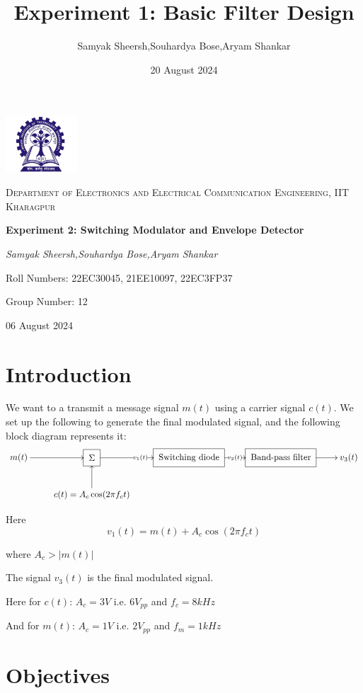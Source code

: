 \documentclass{article}
\title{Experiment 1: Basic Filter Design}
\author{Samyak Sheersh,Souhardya Bose,Aryam Shankar}
\date{20 August 2024}
\begin{document}
\begin{titlepage}
    \centering
    \includegraphics[width=0.2\textwidth]{KGP_logo.png}\par\vspace{1cm}
    {\scshape\LARGE Department of Electronics and Electrical Communication Engineering, IIT Kharagpur\par}
    \vspace{1cm}
    {\huge\bfseries Experiment 2: Switching Modulator and Envelope Detector\par}
    \vspace{1.5cm}
    {\Large\itshape Samyak Sheersh,Souhardya Bose,Aryam Shankar\par}
    \vfill
    {\large Roll Numbers: 22EC30045, 21EE10097, 22EC3FP37\par}
    {\large Group Number: 12\par}
    \vfill
    {\large 06 August 2024\par}
\end{titlepage}


\section{Introduction}

We want to a transmit a message signal $m(t)$ using a carrier signal $c(t)$. We set up the following to generate the final modulated signal, and the following block diagram represents it:
\[\xymatrix{
    m(t) \ar[r] & *++[F]{\Sigma} \ar[r]|{v_1(t)} & *++[F]{\text{Switching diode}} \ar[r]|{v_2(t)} & *++[F]{\text{Band-pass filter}} \ar[r] & v_3(t)\\
& c(t)=A_c \cos(2\pi f_c t) \ar[u]
}\]

Here $$v_1(t) = m(t)+A_c \cos(2\pi f_c t)$$

where $A_c >|m(t)|$

The signal $v_3(t)$ is the final modulated signal. 
\vspace{2mm}

Here for $c(t)$: $A_c=3V$ i.e. $6V_{pp}$ and $f_c=8kHz$


And for $m(t)$: $A_c=1V$ i.e. $2V_{pp}$ and $f_m=1kHz$
\section{Objectives}
\end{document}
